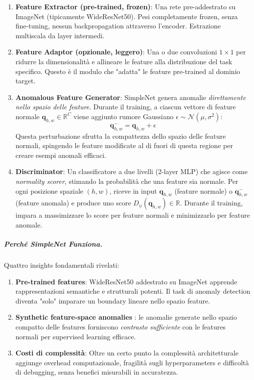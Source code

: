 \begin{enumerate}
    \item \textbf{Feature Extractor (pre-trained, frozen)}: Una rete pre-addestrato su ImageNet (tipicamente WideResNet50). Pesi completamente frozen, senza fine-tuning, nessun backpropagation attraverso l'encoder. Estrazione mul\-ti\-sca\-la da layer intermedi.
    \item \textbf{Feature Adaptor (opzionale, leggero)}: Una o due convoluzioni $1 \times 1$ per ridurre la dimensionalità e allineare le feature alla distribuzione del task specifico. Questo è il modulo che "adatta" le feature pre-trained al dominio target.
    \item \textbf{Anomalous Feature Generator}: SimpleNet genera anomalie \textit{direttamente nello spazio delle feature}. Durante il training, a ciascun vettore di feature normale $\mathbf{q}_{h,w} \in \mathbb{R}^C$ viene aggiunto rumore Gaussiano $\epsilon \sim \mathcal{N}(\mu, \sigma^2)$:
    \begin{equation}
        \mathbf{q}^{-}_{h,w} = \mathbf{q}_{h,w} + \epsilon
    \end{equation}
    Questa perturbazione sfrutta la compattezza dello spazio delle feature normali, spingendo le feature modificate al di fuori di questa regione per creare esempi anomali efficaci.

    \item \textbf{Discriminator}: Un classificatore a due livelli (2-layer MLP) che agisce come \textit{normality scorer}, stimando la probabilità che una feature sia normale. Per ogni posizione spaziale $(h,w)$, riceve in input $\mathbf{q}_{h,w}$ (feature normale) o $\mathbf{q}^{-}_{h,w}$ (feature anomala) e produce uno score $D_{\psi}(\mathbf{q}_{h,w}) \in \mathbb{R}$. Durante il training, impara a massimizzare lo score per feature normali e minimizzarlo per feature anomale.
\end{enumerate}


\subparagraph{Perché SimpleNet Funziona.}

Quattro insights fondamentali rivelati:
\begin{enumerate}
    \item \textbf{Pre-trained features}: WideResNet50 addestrato su ImageNet apprende rappresentazioni semantiche e strutturali potenti. Il task di anomaly detection diventa "solo" imparare un boundary lineare nello spazio feature.
    \item \textbf{Synthetic feature-space anomalies }: le anomalie generate nello spazio compatto delle features forniscono \textit{contrasto sufficiente} con le features normali per supervised learning efficace. 
    \item \textbf{Costi di complessità}: Oltre un certo punto la complessità architetturale aggiunge overhead computazionale, fragilità sugli hyperparameters e difficoltà di debugging, senza benefici misurabili in accuratezza.
\end{enumerate}


